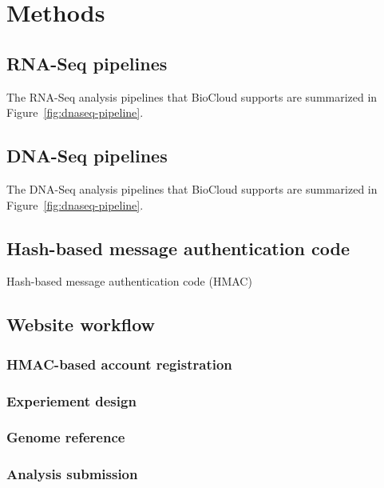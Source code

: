 \chapter{Methods}
\label{c:method}



\section{RNA-Seq pipelines}

The RNA-Seq analysis pipelines that BioCloud supports are summarized in
Figure~\ref{fig:dnaseq-pipeline}.




\section{DNA-Seq pipelines}

The DNA-Seq analysis pipelines that BioCloud supports are summarized in
Figure~\ref{fig:dnaseq-pipeline}.





\section{Hash-based message authentication code}

Hash-based message authentication code (HMAC)



\section{Website workflow}

\subsection{HMAC-based account registration}

\subsection{Experiement design}

\subsection{Genome reference}

\subsection{Analysis submission}

